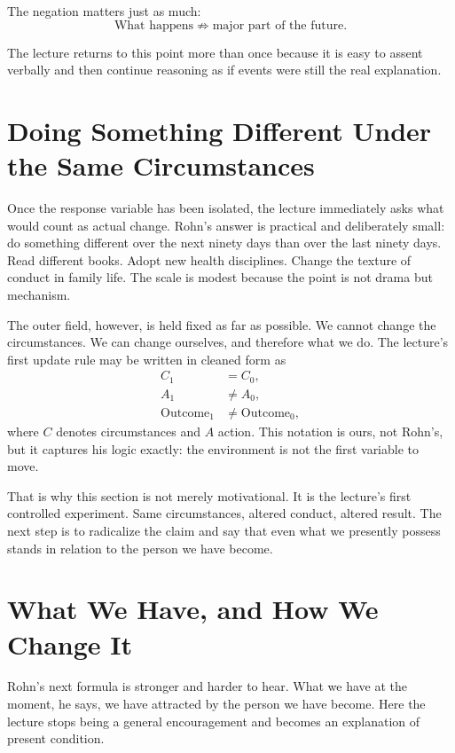 The negation matters just as much:
\begin{equation}
\text{What happens} \not\Longrightarrow \text{major part of the future}.
\end{equation}

The lecture returns to this point more than once because it is easy to assent verbally and then continue reasoning as if events were still the real explanation.

\section{Doing Something Different Under the Same Circumstances}

Once the response variable has been isolated, the lecture immediately asks what would count as actual change. Rohn's answer is practical and deliberately small: do something different over the next ninety days than over the last ninety days. Read different books. Adopt new health disciplines. Change the texture of conduct in family life. The scale is modest because the point is not drama but mechanism.

The outer field, however, is held fixed as far as possible. We cannot change the circumstances. We can change ourselves, and therefore what we do. The lecture's first update rule may be written in cleaned form as
\begin{align}
C_{1} &= C_{0},\\
A_{1} &\neq A_{0},\\
\text{Outcome}_{1} &\neq \text{Outcome}_{0},
\end{align}
where \(C\) denotes circumstances and \(A\) action. This notation is ours, not Rohn's, but it captures his logic exactly: the environment is not the first variable to move.

That is why this section is not merely motivational. It is the lecture's first controlled experiment. Same circumstances, altered conduct, altered result. The next step is to radicalize the claim and say that even what we presently possess stands in relation to the person we have become.

\section{What We Have, and How We Change It}

Rohn's next formula is stronger and harder to hear. What we have at the moment, he says, we have attracted by the person we have become. Here the lecture stops being a general encouragement and becomes an explanation of present condition.


